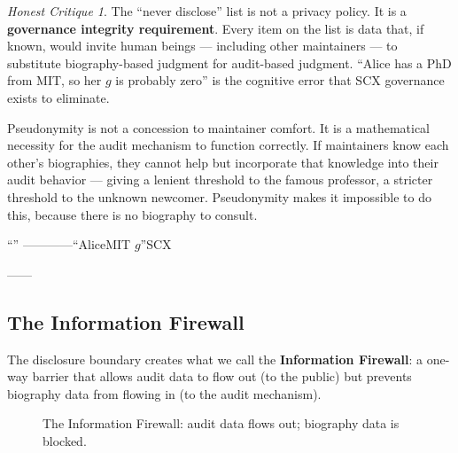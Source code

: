 \documentclass[12pt,a4paper]{article}
\theoremstyle{remark}
\newtheorem{honesthit}{Honest Critique}[section]
\newenvironment{hitbox}{%
  \begin{center}
  \color{red}
  \begin{minipage}{0.92\textwidth}
  \begin{honesthit}
}{%
  \end{honesthit}
  \end{minipage}
  \end{center}
}
\begin{document}
\begin{hitbox}
The ``never disclose'' list is not a privacy policy. It is a \textbf{governance
integrity requirement}. Every item on the list is data that, if known, would
invite human beings — including other maintainers — to substitute biography-based
judgment for audit-based judgment. ``Alice has a PhD from MIT, so her $g$ is
probably zero'' is the cognitive error that SCX governance exists to eliminate.

Pseudonymity is not a concession to maintainer comfort. It is a mathematical
necessity for the audit mechanism to function correctly. If maintainers know
each other's biographies, they cannot help but incorporate that knowledge into
their audit behavior — giving a lenient threshold to the famous professor, a
stricter threshold to the unknown newcomer. Pseudonymity makes it impossible to
do this, because there is no biography to consult.

\begin{center}
\small\textbf{}
“”
————“AliceMIT
$g$”SCX


——

\end{center}
\end{hitbox}

\subsection{The Information Firewall}

The disclosure boundary creates what we call the \textbf{Information Firewall}:
a one-way barrier that allows audit data to flow out (to the public) but
prevents biography data from flowing in (to the audit mechanism).

\begin{figure}[H]
\centering
{}
\caption{The Information Firewall: audit data flows out; biography data is blocked.}
\label{fig:firewall}
\end{figure}
\end{document}
